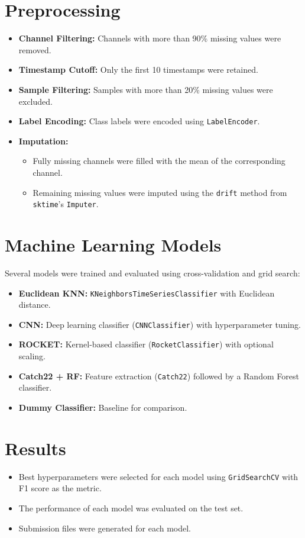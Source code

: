 \documentclass[a4paper,11pt]{article}
\begin{document}
\section{Preprocessing}
\begin{itemize}
    \item \textbf{Channel Filtering:} Channels with more than 90\% missing values were removed.
    \item \textbf{Timestamp Cutoff:} Only the first 10 timestamps were retained.
    \item \textbf{Sample Filtering:} Samples with more than 20\% missing values were excluded.
    \item \textbf{Label Encoding:} Class labels were encoded using \texttt{LabelEncoder}.
    \item \textbf{Imputation:} 
        \begin{itemize}
            \item Fully missing channels were filled with the mean of the corresponding channel.
            \item Remaining missing values were imputed using the \texttt{drift} method from \texttt{sktime}'s \texttt{Imputer}.
        \end{itemize}
\end{itemize}

\section{Machine Learning Models}
Several models were trained and evaluated using cross-validation and grid search:
\begin{itemize}
    \item \textbf{Euclidean KNN:} \texttt{KNeighborsTimeSeriesClassifier} with Euclidean distance.
    \item \textbf{CNN:} Deep learning classifier (\texttt{CNNClassifier}) with hyperparameter tuning.
    \item \textbf{ROCKET:} Kernel-based classifier (\texttt{RocketClassifier}) with optional scaling.
    \item \textbf{Catch22 + RF:} Feature extraction (\texttt{Catch22}) followed by a Random Forest classifier.
    \item \textbf{Dummy Classifier:} Baseline for comparison.
\end{itemize}

\section{Results}
\begin{itemize}
    \item Best hyperparameters were selected for each model using \texttt{GridSearchCV} with F1 score as the metric.
    \item The performance of each model was evaluated on the test set.
    \item Submission files were generated for each model.
\end{itemize}
\end{document}
